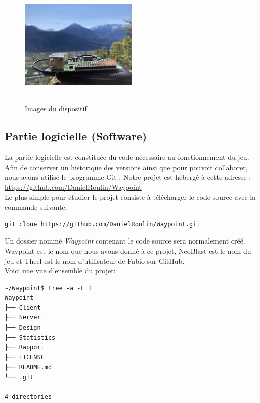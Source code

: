 \documentclass[a4paper]{article}
\begin{document}
\begin{figure}
    \includegraphics[width=0.5\textwidth, height = 6cm]{images/hardware/Raspberry4.jpg}
    \caption{Images du dispositif}
    \label{fig:images_raspberry}
\end{figure}

\subsection{Partie logicielle (Software)}
La partie logicielle est constituée du code nécessaire au fonctionnement du jeu. Afin de conserver un historique des versions ainsi que pour pouvoir collaborer, nous avons utilisé le programme Git \cite{git}.
Notre projet est hébergé à cette adresse : \url{https://github.com/DanielRoulin/Waypoint} \\
Le plus simple pour étudier le projet consiste à télécharger le code source avec la commande suivante:
\begin{verbatim}
git clone https://github.com/DanielRoulin/Waypoint.git
\end{verbatim}
Un dossier nommé \emph{Waypoint} contenant le code source sera normalement créé. \\
Waypoint est le nom que nous avons donné à ce projet, NeoBlast est le nom du jeu et Theel est le nom d'utilisateur de Fabio sur GitHub. \\
Voici une vue d’ensemble du projet:
\begin{verbatim}
~/Waypoint$ tree -a -L 1
Waypoint
├── Client
├── Server
├── Design
├── Statistics
├── Rapport
├── LICENSE
├── README.md
└── .git
 
4 directories
\end{verbatim}
\end{document}
